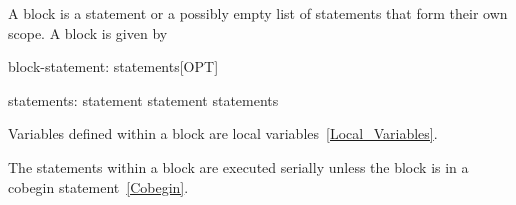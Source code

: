 
A block is a statement or a possibly empty list of statements that
form their own scope.  A block is given by
\begin{syntax}
block-statement:
  { statements[OPT] }
  { }

statements:
  statement
  statement statements
\end{syntax}

Variables defined within a block are local
variables~\ref{Local_Variables}.

The statements within a block are executed serially unless the block
is in a cobegin statement~\ref{Cobegin}.
